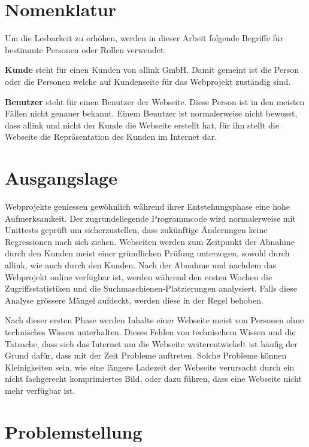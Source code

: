 
\section{Nomenklatur}
\label{sec:nomenklatur}

Um die Lesbarkeit zu erhöhen, werden in dieser Arbeit folgende Begriffe für bestimmte Personen oder Rollen verwendet:

{\bf Kunde} steht für einen Kunden von allink GmbH. Damit gemeint ist die Person oder die Personen welche auf Kundenseite für das Webprojekt zuständig sind.

{\bf Benutzer} steht für einen Benutzer der Webseite. Diese Person ist in den meisten Fällen nicht genauer bekannt. Einem Benutzer ist normalerweise nicht bewusst, dass allink und nicht der Kunde die Webseite erstellt hat, für ihn stellt die Webseite die Repräsentation des Kunden im Internet dar.

\section{Ausgangslage}
\label{sec:ausgangslage}

Webprojekte geniessen gewöhnlich während ihrer Entstehungsphase eine hohe Aufmerksamkeit. Der zugrundeliegende Programmcode wird normalerweise mit Unittests geprüft um sicherzustellen, dass zukünftige Änderungen keine Regressionen nach sich ziehen. Webseiten werden zum Zeitpunkt der Abnahme durch den Kunden meist einer gründlichen Prüfung unterzogen, sowohl durch allink, wie auch durch den Kunden. Nach der Abnahme und nachdem das Webprojekt online verfügbar ist, werden während den ersten Wochen die Zugriffsstatistiken und die Suchmaschienen-Platzierungen analysiert. Falls diese Analyse grössere Mängel aufdeckt, werden diese in der Regel behoben.

Nach dieser ersten Phase werden Inhalte einer Webseite meist von Personen ohne technisches Wissen unterhalten. Dieses Fehlen von technischem Wissen und die Tatsache, dass sich das Internet um die Webseite weiterentwickelt ist häufig der Grund dafür, dass mit der Zeit Probleme auftreten. Solche Probleme können Kleinigkeiten sein, wie eine längere Ladezeit der Webseite verursacht durch ein nicht fachgerecht komprimiertes Bild, oder dazu führen, dass eine Webseite nicht mehr verfügbar ist.

\section{Problemstellung}
\label{sec:problemstellung}

